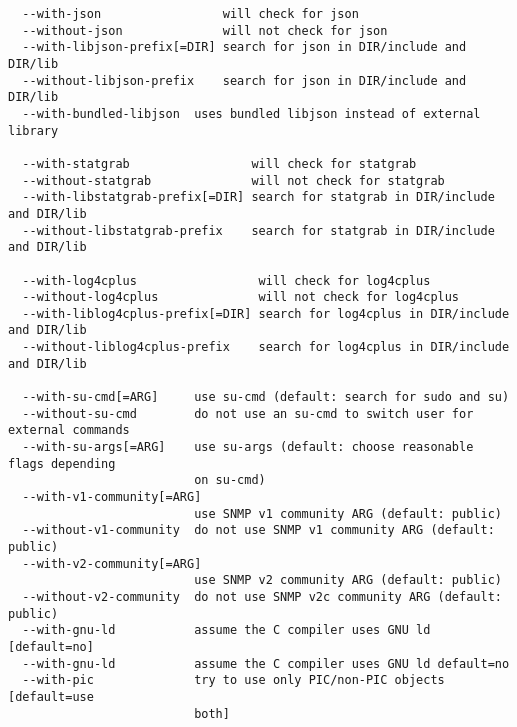 \begin{verbatim}
  --with-json                 will check for json
  --without-json              will not check for json
  --with-libjson-prefix[=DIR] search for json in DIR/include and DIR/lib
  --without-libjson-prefix    search for json in DIR/include and DIR/lib
  --with-bundled-libjson  uses bundled libjson instead of external library

  --with-statgrab                 will check for statgrab
  --without-statgrab              will not check for statgrab
  --with-libstatgrab-prefix[=DIR] search for statgrab in DIR/include and DIR/lib
  --without-libstatgrab-prefix    search for statgrab in DIR/include and DIR/lib

  --with-log4cplus                 will check for log4cplus
  --without-log4cplus              will not check for log4cplus
  --with-liblog4cplus-prefix[=DIR] search for log4cplus in DIR/include and DIR/lib
  --without-liblog4cplus-prefix    search for log4cplus in DIR/include and DIR/lib

  --with-su-cmd[=ARG]     use su-cmd (default: search for sudo and su)
  --without-su-cmd        do not use an su-cmd to switch user for external commands
  --with-su-args[=ARG]    use su-args (default: choose reasonable flags depending
                          on su-cmd)
  --with-v1-community[=ARG]
                          use SNMP v1 community ARG (default: public)
  --without-v1-community  do not use SNMP v1 community ARG (default: public)
  --with-v2-community[=ARG]
                          use SNMP v2 community ARG (default: public)
  --without-v2-community  do not use SNMP v2c community ARG (default: public)
  --with-gnu-ld           assume the C compiler uses GNU ld [default=no]
  --with-gnu-ld           assume the C compiler uses GNU ld default=no
  --with-pic              try to use only PIC/non-PIC objects [default=use
                          both]


\end{verbatim}
